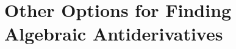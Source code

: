 \section{Other Options for Finding Algebraic Antiderivatives} \label{S:5.5.OtherOpt}



\newpage



\newpage



\newpage

%

\clearpage
